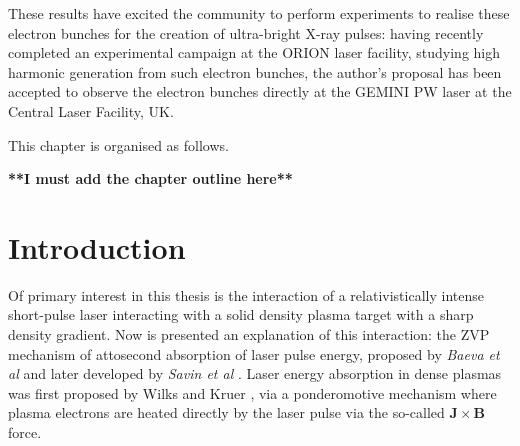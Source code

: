 These results have excited the community to perform experiments to realise these electron bunches for the creation of ultra-bright X-ray pulses: having recently completed an experimental campaign at the ORION laser facility, studying high harmonic generation from such electron bunches, the author's proposal has been accepted to observe the electron bunches directly at the GEMINI PW laser at the Central Laser Facility, UK.

This chapter is organised as follows. 

\textbf{**I must add the chapter outline here**}



\section{Introduction}
Of primary interest in this thesis is the interaction of a relativistically intense short-pulse laser interacting with a solid density plasma target with a sharp density gradient. Now is presented an explanation of this interaction: the \ac{ZVP} mechanism of attosecond absorption of laser pulse energy, proposed by \textit{Baeva et al} \cite{baevaZeroVectorPotential2011} and later developed by \textit{Savin et al} \cite{savinAttosecondscaleAbsorptionExtreme2017,savinModellingLaserPlasmaInteractions2019}. Laser energy absorption in dense plasmas was first proposed by Wilks and Kruer \cite{wilksAbsorptionUltraIntenseLaser1992}, via a ponderomotive mechanism where plasma electrons are heated directly by the laser pulse via the so-called $\mathbf{J}\times \mathbf{B}$ force.


